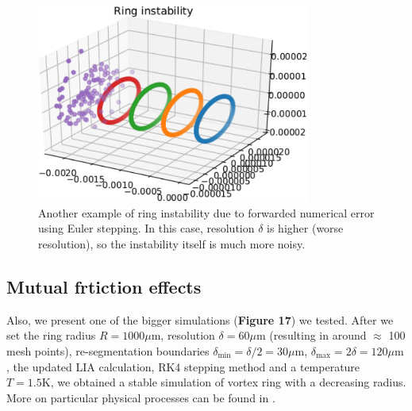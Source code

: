 \begin{figure}[h]
	\centering
	\includegraphics[width=0.8\textwidth]{graphics/results/ring-instability}
	\caption{Another example of ring instability due to forwarded numerical error using Euler stepping. In this case, resolution $\delta$ is higher (worse resolution), so the instability itself is much more noisy.}
\end{figure}

\newpage

\subsection*{Mutual frtiction effects}

Also, we present one of the bigger simulations (\textbf{Figure 17}) we tested. After we set the ring radius $R=1000\mu\text{m}$, resolution $\delta=60\mu\text{m}$ (resulting in around $\approx$ 100 mesh points),
re-segmentation boundaries $\delta_{\text{min}}= \delta /2 = 30\mu\text{m}$, $\delta_{\text{max}} = 2\delta = 120\mu\text{m}$, the updated LIA calculation, RK4 stepping method and a temperature $T=1.5\text{K}$, we obtained a stable simulation of vortex ring with a decreasing radius. More on particular physical processes can be found in \cite{biot_origin}.


